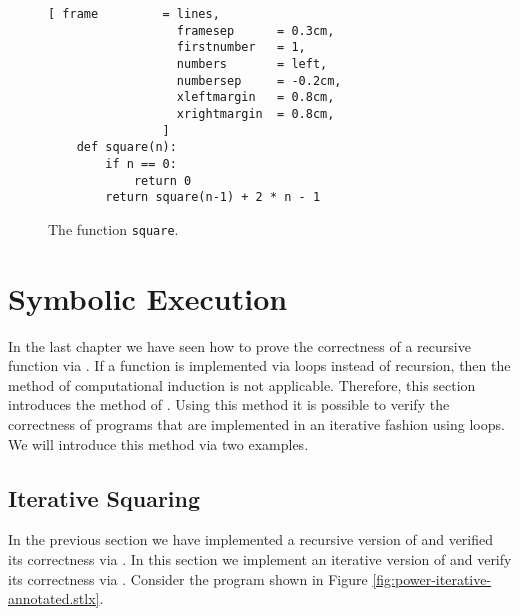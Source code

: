 \begin{figure}[!ht]
\centering
\begin{Verbatim}[ frame         = lines, 
                  framesep      = 0.3cm, 
                  firstnumber   = 1,
                  numbers       = left,
                  numbersep     = -0.2cm,
                  xleftmargin   = 0.8cm,
                  xrightmargin  = 0.8cm,
                ]
    def square(n):
        if n == 0:
            return 0
        return square(n-1) + 2 * n - 1 
\end{Verbatim}
\vspace*{-0.3cm}
\caption{The function \texttt{square}.}
\label{fig:square}
\end{figure}




\section{Symbolic Execution}
In the last chapter we have seen how to prove the correctness of a recursive function via
.  If a function is implemented via loops instead of recursion, then the method
of computational induction is not applicable.  Therefore, this section introduces the method of
.   Using this method it is possible to verify the
correctness of programs that are implemented in an iterative fashion using loops. 
We will introduce this method via two  examples.

\subsection{Iterative Squaring}
In the previous section we have implemented a recursive version of  and verified its
correctness via .  In this section we implement an iterative version of
 and verify its correctness via .
Consider the program shown in Figure \ref{fig:power-iterative-annotated.stlx}. 

